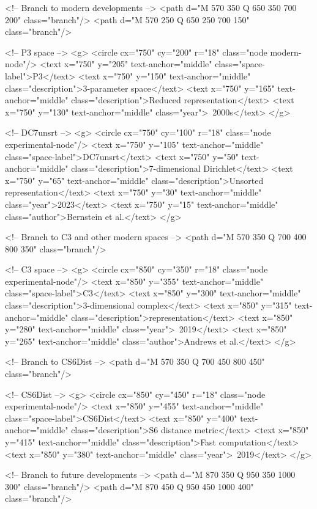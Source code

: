 <!-- Branch to modern developments -->
<path d="M 570 350 Q 650 350 700 200" class="branch"/>
<path d="M 570 250 Q 650 250 700 150" class="branch"/>

<!-- P3 space -->
<g>
<circle cx="750" cy="200" r="18" class="node modern-node"/>
<text x="750" y="205" text-anchor="middle" class="space-label">P3</text>
<text x="750" y="150" text-anchor="middle" class="description">3-parameter space</text>
<text x="750" y="165" text-anchor="middle" class="description">Reduced representation</text>
<text x="750" y="130" text-anchor="middle" class="year">~2000s</text>
</g>

<!-- DC7unsrt -->
<g>
<circle cx="750" cy="100" r="18" class="node experimental-node"/>
<text x="750" y="105" text-anchor="middle" class="space-label">DC7unsrt</text>
<text x="750" y="50" text-anchor="middle" class="description">7-dimensional Dirichlet</text>
<text x="750" y="65" text-anchor="middle" class="description">Unsorted representation</text>
<text x="750" y="30" text-anchor="middle" class="year">2023</text>
<text x="750" y="15" text-anchor="middle" class="author">Bernstein et al.</text>
</g>

<!-- Branch to C3 and other modern spaces -->
<path d="M 570 350 Q 700 400 800 350" class="branch"/>

<!-- C3 space -->
<g>
<circle cx="850" cy="350" r="18" class="node experimental-node"/>
<text x="850" y="355" text-anchor="middle" class="space-label">C3</text>
<text x="850" y="300" text-anchor="middle" class="description">3-dimensional complex</text>
<text x="850" y="315" text-anchor="middle" class="description">representation</text>
<text x="850" y="280" text-anchor="middle" class="year">~2019</text>
<text x="850" y="265" text-anchor="middle" class="author">Andrews et al.</text>
</g>

<!-- Branch to CS6Dist -->
<path d="M 570 350 Q 700 450 800 450" class="branch"/>

<!-- CS6Dist -->
<g>
<circle cx="850" cy="450" r="18" class="node experimental-node"/>
<text x="850" y="455" text-anchor="middle" class="space-label">CS6Dist</text>
<text x="850" y="400" text-anchor="middle" class="description">S6 distance metric</text>
<text x="850" y="415" text-anchor="middle" class="description">Fast computation</text>
<text x="850" y="380" text-anchor="middle" class="year">~2019</text>
</g>

<!-- Branch to future developments -->
<path d="M 870 350 Q 950 350 1000 300" class="branch"/>
<path d="M 870 450 Q 950 450 1000 400" class="branch"/>

